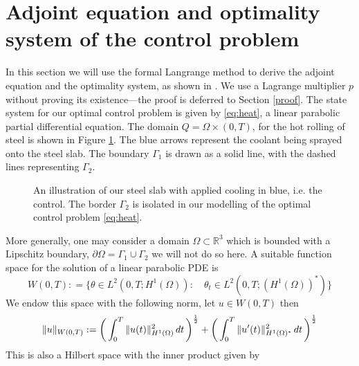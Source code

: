 \section{Adjoint equation and optimality system of the \mbox{control} problem}

In this section we will use the formal Langrange method to derive the adjoint equation and the optimality system, as shown in \cite{optimalControl}. We use a Lagrange multiplier $p$ without proving its existence---the proof is deferred to Section \ref{proof}. The state system for our optimal control problem is given by \eqref{eq:heat}, a linear parabolic partial differential equation.
The domain $Q = \Omega \times (0,T)$, for the hot rolling of steel is shown in Figure \ref{fig:steel_slab}. The blue arrows represent the coolant being sprayed onto the steel slab. The boundary $\Gamma_1$ is drawn as a solid line, with the dashed lines representing $\Gamma_2$. 
\begin{figure}
    \centering
    
    \caption{An illustration of our steel slab with applied cooling in blue, i.e. the control. The border $\Gamma_2$ is isolated in our modelling of the optimal control problem \eqref{eq:heat}.}
    \label{fig:steel_slab}
\end{figure}

More generally, one may consider a domain $\Omega \subset \mathbb{R}^3$ which is bounded with a Lipschitz boundary, $\partial \Omega = \Gamma_1 \cup \Gamma_2$ we will not do so here. A suitable function space for the solution of a linear parabolic PDE is 
\begin{equation}
    \label{eq:funcSpace}
    W(0,T) : = \{ \theta \in L^2(0,T;H^1(\Omega)) : \quad \theta_t \in L^2(0,T;(H^1(\Omega))^{*}) \}
\end{equation}
We endow this space with the following norm, let $u \in W(0,T)$ then 
\begin{equation*}
    \|u\|_{W(0,T)} := \bigg (\int_{0}^T\|u(t)\|^2_{H^{1}(\Omega)}\mathop{dt} \bigg ) ^{\frac{1}{2}} + \bigg (\int_{0}^T\|u'(t)\|^2_{H^{1}(\Omega)^{*}}\mathop{dt} \bigg ) ^{\frac{1}{2}}
\end{equation*}
This is also a Hilbert space with the inner product given by 


